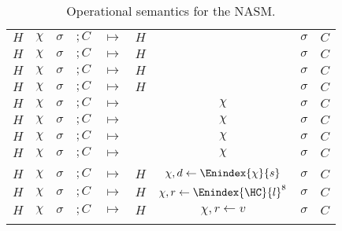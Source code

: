 \begin{xltabular}{\textwidth}{*{4}{>{\scriptsize}c}>{\tiny\bfseries}Y*{4}{>{\scriptsize}c}}
	$H$ & $\chi$ & $\sigma$ & $; C$ & $\bm{\mapsto}$ & $H$ &  & $\sigma$ & $C$ \\
	$H$ & $\chi$ & $\sigma$ & $; C$ & $\bm{\mapsto}$ & $H$ &  & $\sigma$ & $C$ \\
	$H$ & $\chi$ & $\sigma$ & $;C$ & $\bm{\mapsto}$ & $H$ &  & $\sigma$ & $C$ \\
	$H$ & $\chi$ & $\sigma$ & $;C$ & $\bm{\mapsto}$ & $H$ &  & $\sigma$ & $C$ \\
	$H$ & $\chi$ & $\sigma$ & $; C$ & $\bm{\mapsto}$ &  & $\chi$ & $\sigma$ & $C$ \\
	$H$ & $\chi$ & $\sigma$ & $; C$ & $\bm{\mapsto}$ &  & $\chi$ & $\sigma$ & $C$ \\
	$H$ & $\chi$ & $\sigma$ & $; C$ & $\bm{\mapsto}$ &  & $\chi$ & $\sigma$ & $C$ \\
	$H$ & $\chi$ & $\sigma$ & $; C$ & $\bm{\mapsto}$ &  & $\chi$ & $\sigma$ & $C$ \\

	\midrule

	 \\

	$H$ & $\chi$ & $\sigma$ & $; C$ & $\bm{\mapsto}$ & $H$ & $\chi, d \gets \Enindex{\chi}{s}$ & $\sigma$ & $C$ \\
	$H$ & $\chi$ & $\sigma$ & $; C$ & $\bm{\mapsto}$ & $H$ & $\chi, r \gets {\Enindex{\HC}{l}}^{8}$ & $\sigma$ & $C$ \\
	$H$ & $\chi$ & $\sigma$ & $; C$ & $\bm{\mapsto}$ & $H$ & $\chi, r \gets v$ & $\sigma$ & $C$ \\

	\bottomrule

	\caption{Operational semantics for the NASM.}
	\label{fig:nstar-nsam-core-opsemantics}
\end{xltabular}



\endgroup
